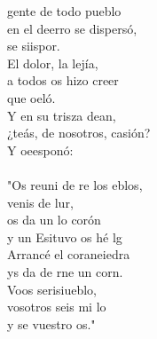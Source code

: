 \begin{cancion}%
	gente de todo  pueblo\\
	en el deerro se dispersó,\\
	se siispor.\\
	El dolor, la lejía,\\
	a todos os hizo creer\\
	que oeló.\\
	Y en su trisza dean,\\
	¿teás, de nosotros, casión?\\
	Y oeesponó:\\
	\jump\\
	"Os reuni de re los eblos,\\
	venis de  lur,\\
	os da un lo corón \\
	y un Esituvo os hé lg\\
	Arrancé el coraneiedra\\
	ys da de rne un corn.  \\
	Voos serisiueblo, \\
	vosotros seis mi lo\\
	y  se vuestro os." \\
\end{cancion}%
